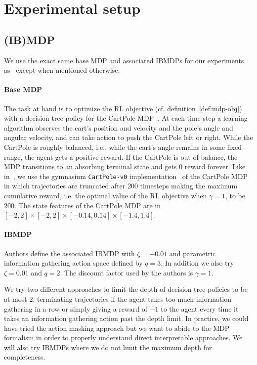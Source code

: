 \section{Experimental setup}
\subsection{(IB)MDP} 

We use the exact same base MDP and associated IBMDPs for our experiments as~\cite{topin2021iterative} except when mentioned otherwise.

\paragraph{Base MDP} The task at hand is to optimize the RL objective (cf. definition~\ref{def:mdp-obj}) with a decision tree policy for the CartPole MDP~\cite{cartpole}.
At each time step a learning algorithm observes the cart's position and velocity and the pole's angle and angular velocity, and can take action to push the CartPole left or right.
While the CartPole is roughly balanced, i.e., while the cart's angle remains in some fixed range, the agent gets a positive reward.
If the CartPole is out of balance, the MDP transitions to an absorbing terminal state and gets 0 reward forever.
Like in~\cite{topin2021iterative}, we use the gymnasium \texttt{CartPole-v0} implementation~\cite{gymnasium} of the CartPole MDP in which trajectories are truncated after 200 timesteps making the maximum cumulative reward, i.e. the optimal value of the RL objective when $\gamma=1$, to be 200.
The state features of the CartPole MDP are in $[-2, 2] \times [-2, 2] \times [-0.14, 0.14] \times [-1.4, 1.4]$.

\paragraph{IBMDP} Authors define the associated IBMDP with $\zeta=-0.01$ and parametric information gathering action space defined by $q=3$.
In addition we also try $\zeta=0.01$ and $q=2$.
The discount factor used by the authors is $\gamma=1$.

We try two different approaches to limit the depth of decision tree policies to be at most 2: terminating trajectories if the agent takes too much information gathering in a row or simply giving a reward of $-1$ to the agent every time it takes an information gathering action past the depth limit.
In practice, we could have tried the action masking approach but we want to abide to the MDP formalism in order to properly understand direct interpretable approaches.
We will also try IBMDPs where we do not limit the maximum depth for completeness.

